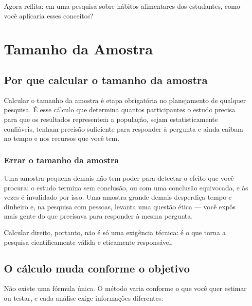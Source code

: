 \documentclass[
]{book}
\begin{document}
Agora reflita: em uma pesquisa sobre hábitos alimentares dos estudantes, como você aplicaria esses conceitos?

\chapter{Tamanho da Amostra}\label{tamanho-da-amostra}

\section{Por que calcular o tamanho da amostra}\label{por-que-calcular-o-tamanho-da-amostra}

Calcular o tamanho da amostra é etapa obrigatória no planejamento de qualquer pesquisa. É esse cálculo que determina quantos participantes o estudo precisa para que os resultados representem a população, sejam estatisticamente confiáveis, tenham precisão suficiente para responder à pergunta e ainda caibam no tempo e nos recursos que você tem.

\subsection{Errar o tamanho da amostra}\label{errar-o-tamanho-da-amostra}

Uma amostra pequena demais não tem poder para detectar o efeito que você procura: o estudo termina sem conclusão, ou com uma conclusão equivocada, e às vezes é invalidado por isso. Uma amostra grande demais desperdiça tempo e dinheiro e, na pesquisa com pessoas, levanta uma questão ética --- você expôs mais gente do que precisava para responder à mesma pergunta.

Calcular direito, portanto, não é só uma exigência técnica: é o que torna a pesquisa cientificamente válida e eticamente responsável.

\section{O cálculo muda conforme o objetivo}\label{o-cuxe1lculo-muda-conforme-o-objetivo}

Não existe uma fórmula única. O método varia conforme o que você quer estimar ou testar, e cada análise exige informações diferentes:
\end{document}
